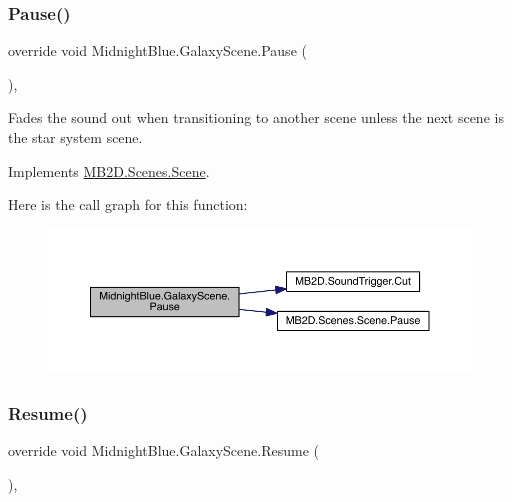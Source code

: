 \subsubsection{\texorpdfstring{Pause()}{Pause()}}
{\footnotesize\ttfamily override void Midnight\+Blue.\+Galaxy\+Scene.\+Pause (\begin{DoxyParamCaption}{ }\end{DoxyParamCaption})\hspace{0.3cm}{\ttfamily [inline]}, {\ttfamily [virtual]}}



Fades the sound out when transitioning to another scene unless the next scene is the star system scene. 



Implements \hyperlink{class_m_b2_d_1_1_scenes_1_1_scene_a0661eff0223150fa8e9ea88145409e5d}{M\+B2\+D.\+Scenes.\+Scene}.

Here is the call graph for this function\+:
\nopagebreak
\begin{figure}[H]
\begin{center}
\leavevmode
\includegraphics[width=350pt]{class_midnight_blue_1_1_galaxy_scene_aeb44afaeda2cccd225e64908bb76bee4_cgraph}
\end{center}
\end{figure}
\hypertarget{class_midnight_blue_1_1_galaxy_scene_ab641e6727cdb64dc6487e9a229521692}{}\label{class_midnight_blue_1_1_galaxy_scene_ab641e6727cdb64dc6487e9a229521692} 
\subsubsection{\texorpdfstring{Resume()}{Resume()}}
{\footnotesize\ttfamily override void Midnight\+Blue.\+Galaxy\+Scene.\+Resume (\begin{DoxyParamCaption}{ }\end{DoxyParamCaption})\hspace{0.3cm}{\ttfamily [inline]}, {\ttfamily [virtual]}}




